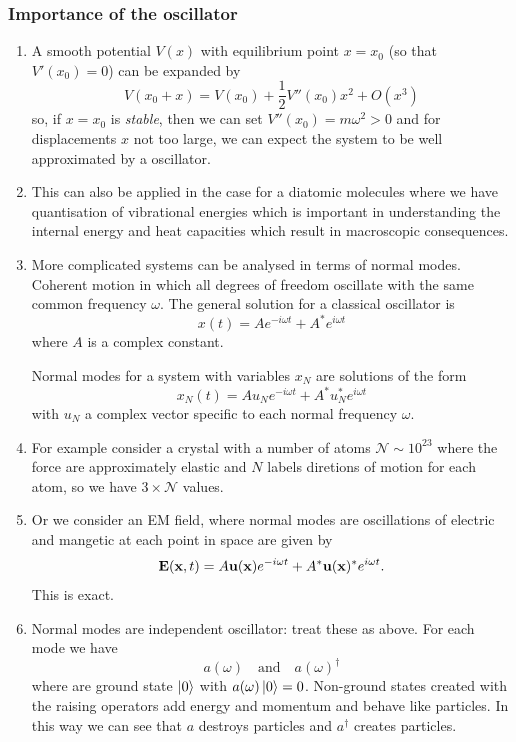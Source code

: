 \documentclass{article}
\begin{document}
\subsubsection{Importance of the oscillator}
\begin{enumerate}
	\item A smooth potential $ V(x) $ with equilibrium point $ x = x_0 $ (so that $ V'(x_0) = 0 $) can be expanded by
		\[
		  V(x_0 + x) = V(x_0) + \frac 12 V''(x_0) x^2 + O(x^3)
		\]
		so, if $ x=x_0 $ is \textit{stable}, then we can set $ V''(x_0) = m\omega^2 > 0 $ and for displacements $ x $ not too large, we can expect the system to be well approximated by a oscillator.
	\item This can also be applied in the case for a diatomic molecules where we have quantisation of vibrational energies which is important in understanding the internal energy and heat capacities which result in macroscopic consequences.
	\item More complicated systems can be analysed in terms of normal modes. Coherent motion in which all degrees of freedom oscillate with the same common frequency $ \omega $. The general solution for a classical oscillator is
		\[
			x(t) = A e^{-i\omega t} + A^* e^{i\omega t}
		\]
		where $ A $ is a complex constant.\par
		Normal modes for a system with variables $ x_N $ are solutions of the form
		\[
			x_N(t) = Au_Ne^{-i\omega t} + A^* u^*_N e^{i\omega t}
		\]
		with $ u_N $ a complex vector specific to each normal frequency $ \omega $.
	\item For example consider a crystal with a number of atoms $ \mathcal N \sim 10^{23} $ where the force are approximately elastic and $ N $ labels diretions of motion for each atom, so we have $ 3\times \mathcal N $ values.
	\item Or we consider an EM field, where normal modes are oscillations of electric and mangetic at each point in space are given by
		\[
			\mathbf E(\mathbf{x},t) = A\mathbf u(\mathbf{x}) e^{-i\omega t} + A^*\mathbf u(\mathbf{x})^*e^{i\omega t}.
		\]
		This is exact.
	\item Normal modes are independent oscillator: treat these as above. For each mode we have
		\[
			a(\omega) \quad\text{and}\quad a(\omega)^\dagger
		\]
		where are ground state $ \ket 0 $ with $ a(\omega)\ket 0  = 0$. Non-ground states created with the raising operators add energy and momentum and behave like particles. In this way we can see that $ a $ destroys particles and $ a^\dagger $ creates particles. 
\end{enumerate}
\end{document}
